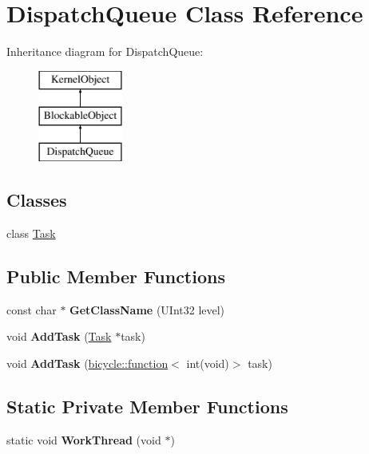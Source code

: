 \hypertarget{class_dispatch_queue}{}\section{Dispatch\+Queue Class Reference}
\label{class_dispatch_queue}
Inheritance diagram for Dispatch\+Queue\+:\begin{figure}[H]
\begin{center}
\leavevmode
\includegraphics[height=3.000000cm]{class_dispatch_queue}
\end{center}
\end{figure}
\subsection*{Classes}
\begin{DoxyCompactItemize}
\item 
class \hyperlink{class_dispatch_queue_1_1_task}{Task}
\end{DoxyCompactItemize}
\subsection*{Public Member Functions}
\begin{DoxyCompactItemize}
\item 
\mbox{\label{class_dispatch_queue_a411cdb6a0c6408f4534f210da8ce6075}} 
const char $\ast$ {\bfseries Get\+Class\+Name} (U\+Int32 level)
\item 
\mbox{\label{class_dispatch_queue_ad19d2087cc2aeacb7c7e007ef46a7717}} 
void {\bfseries Add\+Task} (\hyperlink{class_dispatch_queue_1_1_task}{Task} $\ast$task)
\item 
\mbox{\label{class_dispatch_queue_a0064260523d229021d6d0bb35285641d}} 
void {\bfseries Add\+Task} (\hyperlink{classbicycle_1_1function}{bicycle\+::function}$<$ int(void)$>$ task)
\end{DoxyCompactItemize}
\subsection*{Static Private Member Functions}
\begin{DoxyCompactItemize}
\item 
\mbox{\label{class_dispatch_queue_a6c66705437b5735aa2fd87ac78129e48}} 
static void {\bfseries Work\+Thread} (void $\ast$)
\end{DoxyCompactItemize}
